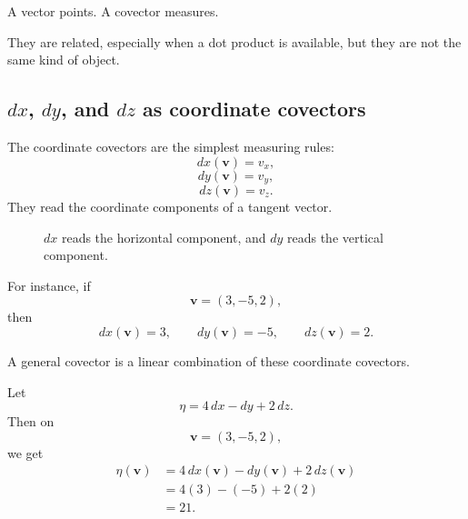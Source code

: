A vector points.  A covector measures.

They are related, especially when a dot product is available, but they are not the same
kind of object.

\subsection{\texorpdfstring{\(dx\), \(dy\), and \(dz\)}{dx, dy, and dz} as coordinate covectors}

The coordinate covectors are the simplest measuring rules:
\[
    dx(\mathbf v)=v_x,
\]
\[
    dy(\mathbf v)=v_y,
\]
\[
    dz(\mathbf v)=v_z.
\]
They read the coordinate components of a tangent vector.

\begin{figure}[h]
\centering
{}
\caption{\(dx\) reads the horizontal component, and \(dy\) reads the vertical component.}
\end{figure}

For instance, if
\[
    \mathbf v=(3,-5,2),
\]
then
\[
    dx(\mathbf v)=3,
    \qquad
    dy(\mathbf v)=-5,
    \qquad
    dz(\mathbf v)=2.
\]

A general covector is a linear combination of these coordinate covectors.

\begin{example}
Let
\[
    \eta=4\,dx-dy+2\,dz.
\]
Then on
\[
    \mathbf v=(3,-5,2),
\]
we get
\[
\begin{aligned}
    \eta(\mathbf v)
    &=
    4\,dx(\mathbf v)-dy(\mathbf v)+2\,dz(\mathbf v)\\
    &=
    4(3)-(-5)+2(2)\\
    &=
    21.
\end{aligned}
\]
\end{example}

